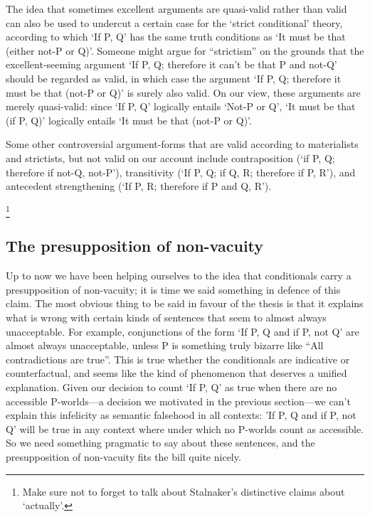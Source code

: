 The idea that sometimes excellent arguments are quasi-valid rather than
valid can also be used to undercut a certain case for the `strict
conditional' theory, according to which `If P, Q' has the same truth
conditions as `It must be that (either not-P or Q)'. Someone might argue
for ``strictism'' on the grounds that the excellent-seeming argument `If
P, Q; therefore it can't be that P and not-Q' should be regarded as
valid, in which case the argument `If P, Q; therefore it must be that
(not-P or Q)' is surely also valid. On our view, these arguments are
merely quasi-valid: since `If P, Q' logically entails `Not-P or Q', `It
must be that (if P, Q)' logically entails `It must be that (not-P or
Q)'.

Some other controversial argument-forms that are valid according to
materialists and strictists, but not valid on our account include
contraposition (`if P, Q; therefore if not-Q, not-P'), transitivity (`If
P, Q; if Q, R; therefore if P, R'), and antecedent strengthening (`If P,
R; therefore if P and Q, R').

\footnote{Make sure not to forget to talk about Stalnaker's distinctive
  claims about `actually'.}

\subsection{The presupposition of
non-vacuity}\label{the-presupposition-of-non-vacuity}

Up to now we have been helping ourselves to the idea that conditionals
carry a presupposition of non-vacuity; it is time we said something in
defence of this claim. The most obvious thing to be said in favour of
the thesis is that it explains what is wrong with certain kinds of
sentences that seem to almost always unacceptable. For example,
conjunctions of the form `If P, Q and if P, not Q' are almost always
unacceptable, unless P is something truly bizarre like ``All
contradictions are true''. This is true whether the conditionals are
indicative or counterfactual, and seems like the kind of phenomenon that
deserves a unified explanation. Given our decision to count `If P, Q' as
true when there are no accessible P-worlds---a decision we motivated in
the previous section---we can't explain this infelicity as semantic
falsehood in all contexts: 'If P, Q and if P, not Q' will be true in any
context where under which no P-worlds count as accessible. So we need
something pragmatic to say about these sentences, and the presupposition
of non-vacuity fits the bill quite nicely.

